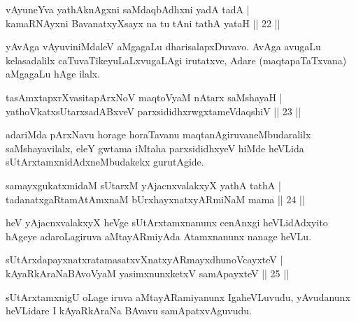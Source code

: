 \begin{shl}
vAyuneYva yathA\s knAgxni saMdaqbAdhxni yadA tadA |\\
kamaRNAyxni BavanatxyXsayx na tu tAni tathA yataH \hfill || 22 ||
\end{shl}

\begin{artha}
yAvAga vAyuviniMdaleV aMgagaLu dharisalapxDuvavo. AvAga avugaLu kelasadalilx caTuvaTikeyuLaLxvugaLAgi irutatxve, Adare (maqtapaTaTxvana) aMgagaLu hAge ilalx.
\end{artha}

\begin{shl}
tasAmxtapxrXvasitapArxNoV maqtoV\s yaM nAtarx saMshayaH |\\
yathoVkatxsUtarxsadABxveV parxsididhxrwgxtameVdaqshiV \hfill || 23 ||
\end{shl}

\begin{artha}%
adariMda pArxNavu horage horaTavanu maqtanAgiruvaneMbudaralilx saMshayavilalx, eleY gwtama iMtaha parxsididhxyeV hiMde heVLida sUtArxtamxnidAdxneMbudakekx gurutAgide.
\end{artha}

\begin{shl}
samayxgukatxmidaM sUtarxM yAjacnxvalakxyX yathA tathA |\\
tadanatxgaRtamAtAmxnaM bUrxhayxnatxyARmiNaM mama \hfill || 24 ||
\end{shl}

\begin{artha}
heV yAjacnxvalakxyX heVge sUtArxtamxnanunx cenAnxgi heVLidAdxyito hAgeye adaroLagiruva aMtayARmiyAda Atamxnanunx nanage heVLu.
\end{artha}


\begin{shl}
sUtArxdapayxnatxratamasatxvXnatxyARmayxdhunoVcayxteV |\\
kAyaRkAraNaBAvoV\s yaM yasimxnunxketxV samApayxteV \hfill || 25 ||
\end{shl}

\begin{artha}
sUtArxtamxnigU oLage iruva aMtayARamiyanunx Iga\break heVLuvudu, yAvudanunx heVLidare I kAyaRkAraNa BAvavu samApatxvAguvudu.
\end{artha}


